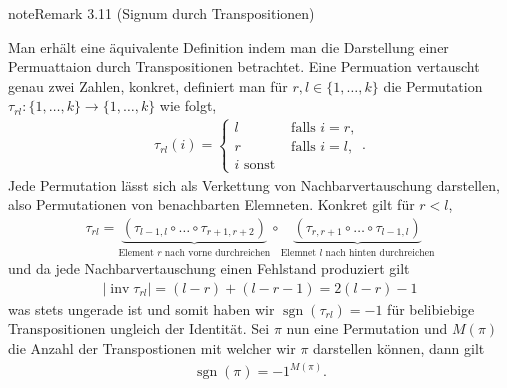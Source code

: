 \documentclass[letterpaper,10pt,german]{jupyterBook}
\begin{document}
\begin{sphinxadmonition}{note}{Remark 3.11 (Signum durch Transpositionen)}



\sphinxAtStartPar
Man erhält eine äquivalente Definition indem man die Darstellung einer Permuattaion durch Transpositionen betrachtet. Eine Permuation vertauscht genau zwei Zahlen, konkret, definiert man für \(r,l\in\{1,\ldots,k\}\) die Permutation \(\tau_{rl}:\{1,\ldots,k\}\to\{1,\ldots,k\}\) wie folgt,
\begin{equation*}
\begin{split}\tau_{rl}(i) = 
\begin{cases}
l&\text{ falls } i=r,\\
r&\text{ falls } i=l,\\
i\text{ sonst}
\end{cases}.\end{split}
\end{equation*}
\sphinxAtStartPar
Jede Permutation lässt sich als Verkettung von Nachbarvertauschung darstellen, also Permutationen von benachbarten Elemneten. Konkret gilt für \(r<l\),
\begin{equation*}
\begin{split}\tau_{rl} = \underbrace{\left(\tau_{l-1,l}\circ\ldots\circ \tau_{r+1,r+2} \right)}_{\text{Element }r\text{ nach vorne durchreichen}}\circ
\underbrace{\left(\tau_{r,r+1}\circ\ldots\circ \tau_{l-1,l} \right)}_{\text{Elemnet }l\text{ nach hinten durchreichen}}\end{split}
\end{equation*}
\sphinxAtStartPar
und da jede Nachbarvertauschung einen Fehlstand produziert gilt
\begin{equation*}
\begin{split}|\operatorname{inv}\tau_{rl}| = (l-r) + (l-r-1) = 2(l-r)-1\end{split}
\end{equation*}
\sphinxAtStartPar
was stets ungerade ist und somit haben wir \(\operatorname{sgn}(\tau_{rl}) = -1\) für belibiebige Transpositionen ungleich der Identität.
Sei \(\pi\) nun eine Permutation und \(M(\pi)\) die Anzahl der Transpostionen mit welcher wir \(\pi\) darstellen können, dann gilt
\begin{equation*}
\begin{split}\operatorname{sgn}(\pi) = -1^{M(\pi)}.\end{split}
\end{equation*}\end{sphinxadmonition}
\end{document}
